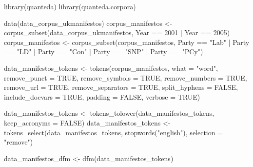 \documentclass[
]{book}
\newenvironment{Shaded}{\begin{snugshade}}{\end{snugshade}}
\newcommand{\AttributeTok}[1]{\textcolor[rgb]{0.77,0.63,0.00}{#1}}
\newcommand{\ConstantTok}[1]{\textcolor[rgb]{0.00,0.00,0.00}{#1}}
\newcommand{\DecValTok}[1]{\textcolor[rgb]{0.00,0.00,0.81}{#1}}
\newcommand{\FunctionTok}[1]{\textcolor[rgb]{0.00,0.00,0.00}{#1}}
\newcommand{\NormalTok}[1]{#1}
\newcommand{\OtherTok}[1]{\textcolor[rgb]{0.56,0.35,0.01}{#1}}
\newcommand{\SpecialCharTok}[1]{\textcolor[rgb]{0.00,0.00,0.00}{#1}}
\newcommand{\StringTok}[1]{\textcolor[rgb]{0.31,0.60,0.02}{#1}}
\begin{document}
\begin{Shaded}
\begin{Highlighting}[]
\FunctionTok{library}\NormalTok{(quanteda)}
\FunctionTok{library}\NormalTok{(quanteda.corpora)}

\FunctionTok{data}\NormalTok{(data\_corpus\_ukmanifestos)}
\NormalTok{corpus\_manifestos }\OtherTok{\textless{}{-}} \FunctionTok{corpus\_subset}\NormalTok{(data\_corpus\_ukmanifestos, }
\NormalTok{    Year }\SpecialCharTok{==} \DecValTok{2001} \SpecialCharTok{|}\NormalTok{ Year }\SpecialCharTok{==} \DecValTok{2005}\NormalTok{)}
\NormalTok{corpus\_manifestos }\OtherTok{\textless{}{-}} \FunctionTok{corpus\_subset}\NormalTok{(corpus\_manifestos, Party }\SpecialCharTok{==} 
    \StringTok{"Lab"} \SpecialCharTok{|}\NormalTok{ Party }\SpecialCharTok{==} \StringTok{"LD"} \SpecialCharTok{|}\NormalTok{ Party }\SpecialCharTok{==} \StringTok{"Con"} \SpecialCharTok{|}\NormalTok{ Party }\SpecialCharTok{==} \StringTok{"SNP"} \SpecialCharTok{|} 
\NormalTok{    Party }\SpecialCharTok{==} \StringTok{"PCy"}\NormalTok{)}

\NormalTok{data\_manifestos\_tokens }\OtherTok{\textless{}{-}} \FunctionTok{tokens}\NormalTok{(corpus\_manifestos, }\AttributeTok{what =} \StringTok{"word"}\NormalTok{, }
    \AttributeTok{remove\_punct =} \ConstantTok{TRUE}\NormalTok{, }\AttributeTok{remove\_symbols =} \ConstantTok{TRUE}\NormalTok{, }\AttributeTok{remove\_numbers =} \ConstantTok{TRUE}\NormalTok{, }
    \AttributeTok{remove\_url =} \ConstantTok{TRUE}\NormalTok{, }\AttributeTok{remove\_separators =} \ConstantTok{TRUE}\NormalTok{, }\AttributeTok{split\_hyphens =} \ConstantTok{FALSE}\NormalTok{, }
    \AttributeTok{include\_docvars =} \ConstantTok{TRUE}\NormalTok{, }\AttributeTok{padding =} \ConstantTok{FALSE}\NormalTok{, }\AttributeTok{verbose =} \ConstantTok{TRUE}\NormalTok{)}

\NormalTok{data\_manifestos\_tokens }\OtherTok{\textless{}{-}} \FunctionTok{tokens\_tolower}\NormalTok{(data\_manifestos\_tokens, }
    \AttributeTok{keep\_acronyms =} \ConstantTok{FALSE}\NormalTok{)}
\NormalTok{data\_manifestos\_tokens }\OtherTok{\textless{}{-}} \FunctionTok{tokens\_select}\NormalTok{(data\_manifestos\_tokens, }
    \FunctionTok{stopwords}\NormalTok{(}\StringTok{"english"}\NormalTok{), }\AttributeTok{selection =} \StringTok{"remove"}\NormalTok{)}

\NormalTok{data\_manifestos\_dfm }\OtherTok{\textless{}{-}} \FunctionTok{dfm}\NormalTok{(data\_manifestos\_tokens)}
\end{Highlighting}
\end{Shaded}
\end{document}
